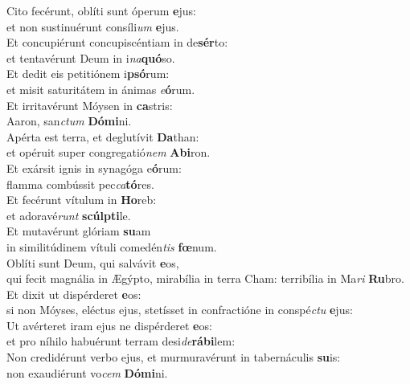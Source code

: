 \evenverse Cito fecérunt, oblíti sunt óperum \textbf{e}jus:~\*\\
\evenverse et non sustinuérunt consíli\textit{um} \textbf{e}jus.\\
\oddverse Et concupiérunt concupiscéntiam in de\textbf{sér}to:~\*\\
\oddverse et tentavérunt Deum in i\textit{na}\textbf{quó}so.\\
\evenverse Et dedit eis petitiónem i\textbf{psó}rum:~\*\\
\evenverse et misit saturitátem in ánimas \textit{e}\textbf{ó}rum.\\
\oddverse Et irritavérunt Móysen in \textbf{ca}stris:~\*\\
\oddverse Aaron, san\textit{ctum} \textbf{Dó}\textbf{mi}ni.\\
\evenverse Apérta est terra, et deglutívit \textbf{Da}than:~\*\\
\evenverse et opéruit super congregatió\textit{nem} \textbf{A}\textbf{bi}ron.\\
\oddverse Et exársit ignis in synagóga e\textbf{ó}rum:~\*\\
\oddverse flamma combússit pec\textit{ca}\textbf{tó}res.\\
\evenverse Et fecérunt vítulum in \textbf{Ho}reb:~\*\\
\evenverse et adoravé\textit{runt} \textbf{scúl}\textbf{pti}le.\\
\oddverse Et mutavérunt glóriam \textbf{su}am~\*\\
\oddverse in similitúdinem vítuli comedén\textit{tis} \textbf{fœ}num.\\
\evenverse Oblíti sunt Deum, qui salvávit \textbf{e}os,~\*\\
\evenverse qui fecit magnália in Ægýpto, mirabília in terra Cham: terribília in Ma\textit{ri} \textbf{Ru}bro.\\
\oddverse Et dixit ut dispérderet \textbf{e}os:~\*\\
\oddverse si non Móyses, eléctus ejus, stetísset in confractióne in conspé\textit{ctu} \textbf{e}jus:\\
\evenverse Ut avérteret iram ejus ne dispérderet \textbf{e}os:~\*\\
\evenverse et pro níhilo habuérunt terram desi\textit{de}\textbf{rá}\textbf{bi}lem:\\
\oddverse Non credidérunt verbo ejus, et murmuravérunt in tabernáculis \textbf{su}is:~\*\\
\oddverse non exaudiérunt vo\textit{cem} \textbf{Dó}\textbf{mi}ni.\\
